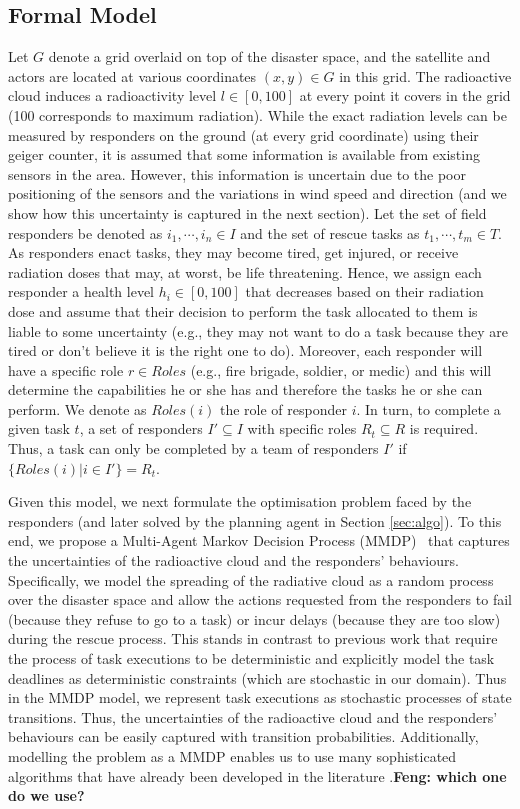 \subsection{Formal Model}
\noindent Let $G$ denote a grid overlaid on top of the disaster space, and the satellite and actors are located at various coordinates $(x,y) \in G$ in this grid. The radioactive cloud induces a radioactivity level  $l \in [0,100]$ at every point it covers in the grid (100 corresponds to maximum radiation). While the exact radiation levels can be measured by responders on the ground (at every grid coordinate) using their geiger counter, it is assumed that some information is available  from existing sensors  in the area. However, this information is uncertain due to the poor positioning of the sensors and the variations in wind speed and direction (and we show how this uncertainty is captured in the next section). Let the set of field responders be denoted as $i_1, \cdots, i_n \in I$ and the set of rescue tasks as  $t_1,\cdots, t_m\in T$.  As responders enact tasks, they may become tired, get injured, or receive radiation doses that may, at worst, be life threatening. Hence, we assign each responder  a health level $h_i\in [0,100]$ that decreases based on their radiation dose and assume that their decision to perform the task allocated to them is liable to some uncertainty (e.g., they may not want to do a task because they are tired or don't believe it is the right one to do). Moreover, each responder will have  a specific role  $r \in Roles$ (e.g., fire brigade, soldier, or medic) and this will determine the capabilities he or she has and therefore the tasks he or she can perform. We denote as $Roles(i)$ the role of responder $i$. In turn, to complete a given task $t$,  a set of responders $I' \subseteq I$ with specific roles $R_t \subseteq R$ is required. Thus, a task can only be completed by a team of responders $I'$ if $\{Roles(i) | i \in I'\} = R_t$. 

Given this model, we next formulate the optimisation problem faced by the responders (and later solved by the planning agent in Section \ref{sec:algo}). To this end, we propose a Multi-Agent Markov Decision Process (MMDP)~\cite{?} that captures the uncertainties of the radioactive cloud and the responders' behaviours. Specifically, we model the spreading of the radiative cloud as a random process over the disaster space and allow the actions requested from the responders to  fail (because they refuse to go to a  task) or incur delays (because they are too slow) during the rescue process. This stands in contrast to previous work \cite{csftp,HTSSC} that require the process of task executions to be deterministic and explicitly model the task deadlines as deterministic constraints (which are stochastic in our domain). Thus in the MMDP model, we represent  task executions as stochastic processes of state transitions. Thus, the uncertainties of the radioactive cloud and the responders' behaviours can be easily captured with transition probabilities. Additionally, modelling the problem as a MMDP enables us to use many sophisticated algorithms that have already been developed in the literature \cite{XX,YY,ZZ}.\textbf{Feng: which one do we use?}



